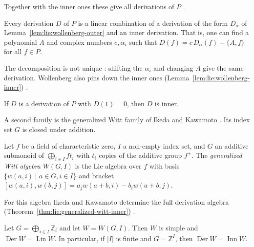 Together with the inner ones these give all derivations of $P$
\cite[Theorem~1, p.~318]{Wollenberg1969}.

\begin{theorem}\label{thm:lie:wollenberg-derivations}
Every derivation $D$ of $P$ is a linear combination of a derivation of
the form $D_{\alpha}$ of Lemma~\ref{lem:lie:wollenberg-outer} and an inner
derivation.  That is, one can find a polynomial $A$ and complex numbers
$c,\alpha_{i}$ such that $D(f)=c\,D_{\alpha}(f)+\{A,f\}$ for all $f\in P$.
\end{theorem}

The decomposition is not unique \cite[Remark, p.~318]{Wollenberg1969}:
shifting the $\alpha_{i}$ and changing $A$ give the same derivation.
Wollenberg also pins down the inner ones (Lemma~\ref{lem:lie:wollenberg-inner})
\cite[Lemma~3, p.~317]{Wollenberg1969}.\begin{lemma}\label{lem:lie:wollenberg-inner}
If $D$ is a derivation of $P$ with $D(1)=0$, then $D$ is inner.
\end{lemma}

A second family is the generalized Witt family of Ikeda and Kawamoto
\cite[p.~47]{IkedaKawamoto1990}.  Its index set $G$ is closed under
addition.

\begin{definition}\label{def:lie:generalized-witt}
Let $f$ be a field of characteristic zero, $I$ a non-empty index set, and
$G$ an additive submonoid of $\bigoplus_{i\in I} f t_{i}$ with
$t_{i}$ copies of the additive group $f^{+}$.  The \emph{generalized Witt
algebra} $W(G,I)$ is the Lie algebra over $f$ with basis
$\{w(a,i)\mid a\in G, i\in I\}$ and bracket
$[w(a,i),w(b,j)]=a_{j}w(a+b,i)-b_{i}w(a+b,j)$.
\end{definition}

For this algebra Ikeda and Kawamoto determine the full derivation algebra
(Theorem~\ref{thm:lie:generalized-witt-inner}) \cite[Theorem~2,
p.~54]{IkedaKawamoto1990}.

\begin{theorem}\label{thm:lie:generalized-witt-inner}
Let $G=\bigoplus_{i\in I}\mathbb{Z}_{i}$ and let $W=W(G,I)$.  Then $W$ is
simple and $\operatorname{Der} W=\operatorname{Lin} W$.  In particular, if
$|I|$ is finite and $G=\mathbb{Z}^{I}$, then
$\operatorname{Der} W=\operatorname{Inn} W$.
\end{theorem}


